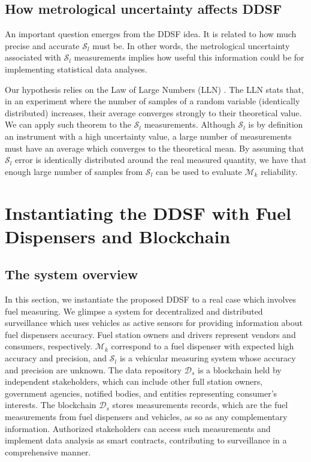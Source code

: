 \documentclass[sigplan]{acmart}
\begin{document}
\subsection{How metrological uncertainty affects DDSF}
\label{s:uncertainty}
An important question emerges from the DDSF idea.
It is related to how much precise and accurate $\mathcal{S}_l$ must be.
In other words, the metrological uncertainty associated with $\mathcal{S}_l$ measurements implies how useful this information could be for implementing statistical data analyses.

Our hypothesis relies on the Law of Large Numbers (LLN) \cite{evans2004probability}.
The LLN stats that, in an experiment where the number of samples of a random variable (identically distributed) increases, their average converges strongly to their theoretical value.
We can apply such theorem to the $\mathcal{S}_l$ measurements.
Although $\mathcal{S}_l$ is by definition an instrument with a high uncertainty value, a large number of measurements must have an average which converges to the theoretical mean.
By assuming that $\mathcal{S}_l$ error is identically distributed around the real measured quantity, we have that enough large number of samples from $\mathcal{S}_l$ can be used to evaluate $\mathcal{M}_k$ reliability.

\section{Instantiating the DDSF with Fuel Dispensers and Blockchain}
\subsection{The system overview}
In this section, we instantiate the proposed DDSF to a real case which involves fuel measuring.
We glimpse a system for decentralized and distributed surveillance which uses vehicles as active sensors for providing information about fuel dispensers accuracy.
Fuel station owners and drivers represent vendors and consumers, respectively.
$\mathcal{M}_k$ correspond to a fuel dispenser with expected high accuracy and precision, and $\mathcal{S}_l$ is a vehicular measuring system whose accuracy and precision are unknown.
The data repository $\mathcal{D}_s$ is a blockchain held by independent stakeholders, which can include other full station owners, government agencies, notified bodies, and entities representing consumer's interests.
The blockchain $\mathcal{D}_s$ stores measurements records, which are the fuel measurements from fuel dispensers and vehicles, as so as any complementary information.
Authorized stakeholders can access such measurements and implement data analysis as smart contracts, contributing to surveillance in a comprehensive manner.
\end{document}
